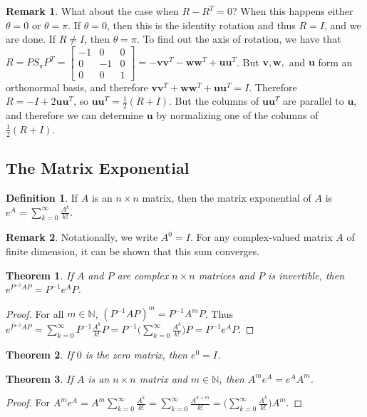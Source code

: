 \documentclass[oneside]{book}
\newtheorem{theorem}{Theorem}[section]
\theoremstyle{definition}
\newtheorem{definition}{Definition}[section]
\newtheorem{remark}{Remark}[section]
\newcommand*\B[1]{\mathbf{#1}}
\begin{document}
\begin{remark}
What about the case when $R-R^T = 0$? When this happens either $\theta = 0$ or $\theta = \pi$. If $\theta = 0$, then this is the identity rotation and thus $R = I$, and we are done. If $R\ne I$, then $\theta = \pi$. To find out the axis of rotation, we have that $R = PS_{\pi}P^T = \begin{bmatrix}-1 & 0 & 0 \\ 0 & -1 & 0 \\ 0 & 0 & 1 \end{bmatrix} = -\B{v}\B{v}^T - \B{w}\B{w}^T +\B{u}\B{u}^T$. But $\B{v},\B{w},$ and $\B{u}$ form an orthonormal basis, and therefore $\B{v}\B{v}^T + \B{w}\B{w}^T+\B{u}\B{u}^T = I$. Therefore $R = -I+2\B{u}\B{u}^T$, so $\B{u} \B{u}^T = \frac{1}{2}(R+I)$. But the columns of $\B{u}\B{u}^T$ are parallel to $\B{u}$, and therefore we can determine $\B{u}$ by normalizing one of the columns of $\frac{1}{2}(R+I)$.
\end{remark}

\subsection{The Matrix Exponential}

\begin{definition}
If $A$ is an $n\times n$ matrix, then the matrix exponential of $A$ is $e^{A} =\sum_{k=0}^{\infty} \frac{A^k}{k!}$.
\end{definition}

\begin{remark}
Notationally, we write $A^0 = I$. For any complex-valued matrix $A$ of finite dimension, it can be shown that this sum converges.
\end{remark}

\begin{theorem}
If $A$ and $P$ are complex $n\times n$ matrices and $P$ is invertible, then $e^{P^{-1}AP} = P^{-1}e^{A}P$.
\end{theorem}
\begin{proof}
For all $m\in \mathbb{N}$, $(P^{-1}AP)^m = P^{-1}A^mP$. Thus $e^{P^{-1}AP} = \sum_{k=0}^{\infty} P^{-1}\frac{A^k}{k!}P = P^{-1}\big(\sum_{k=0}^{\infty} \frac{A^k}{k!}\big)P = P^{-1}e^A P$.
\end{proof}

\begin{theorem}
If $0$ is the zero matrix, then $e^0 = I$.
\end{theorem}

\begin{theorem}
If $A$ is an $n\times n$ matrix and $m\in \mathbb{N}$, then $A^m e^A = e^A A^m$.
\end{theorem}
\begin{proof}
For $A^m e^A = A^m \sum_{k=0}^{\infty} \frac{A^k}{k!} = \sum_{k=0}^{\infty} \frac{A^{k+m}}{k!} = \big(\sum_{k=0}^{\infty} \frac{A^k}{k!}\big)A^m$.
\end{proof}
\end{document}
